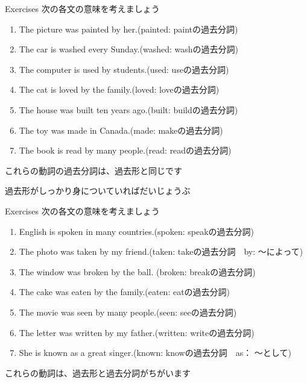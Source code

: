 \documentclass[aspectratio=169,xcolor={dvipsnames,table}]{beamer}
\newcommand{\myaudio}[1]{\href{#1}{\faVolumeUp}}
\begin{document}
\begin{frame}[plain]{Exercises}
 次の各文の意味を考えましょう\hfill\myaudio{./audio/051_passive_02.mp3}


\begin{enumerate}
 \item The picture was painted by her.\hfill{}(painted: paintの過去分詞)
 \item The car is washed every Sunday.\hfill{}(washed: washの過去分詞)
 \item The computer is used by students.\hfill{}(used: useの過去分詞)
 \item The cat is loved by the family.\hfill{}(loved: loveの過去分詞)
 \item The house was built ten years ago.\hfill{}(built: buildの過去分詞)
 \item The toy was made in Canada.\hfill{}(made: makeの過去分詞)
 \item The book is read by many people.\hfill{}(read: readの過去分詞)
\end{enumerate}

\pause

これらの動詞の過去分詞は、過去形と同じです

\vspace{-5pt}

過去形がしっかり身についていればだいじょうぶ
\end{frame}
\begin{frame}[plain]{Exercises}
 次の各文の意味を考えましょう\hfill\myaudio{./audio/051_passive_03.mp3}


 \begin{enumerate}
\item English is spoken in many countries.\hfill{}(spoken: speakの過去分詞)
\item The photo was taken by my friend.\hfill{}(taken: takeの過去分詞　by: 〜によって)
\item The window was broken by the ball.\hfill{} (broken: breakの過去分詞)
\item The cake was eaten by the family.\hfill{}(eaten: eatの過去分詞)
\item The movie was seen by many people.\hfill{}(seen: seeの過去分詞)
\item The letter was written by my father.\hfill{}(written: writeの過去分詞)
\item She is known as a great singer.\hfill{}(known: knowの過去分詞　as： 〜として)
\end{enumerate}

\pause

これらの動詞は、過去形と過去分詞がちがいます

\end{frame}
\end{document}
